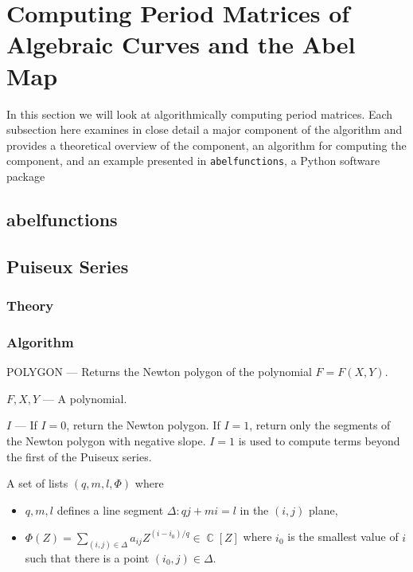 \documentclass[10pt,twoside]{article}
\newcommand{\Input}{\Require}
\newcommand{\Output}{\Ensure}
\numberwithin{equation}{section}
\DeclareMathOperator{\CC}{\mathbb{C}}
\begin{document}
\section{Computing Period Matrices of Algebraic Curves and the Abel Map}

In this section we will look at algorithmically computing period
matrices. Each subsection here examines in close detail a major
component of the algorithm and provides a theoretical overview of the
component, an algorithm for computing the component, and an example
presented in {\tt abelfunctions}, a Python software package


\subsection{abelfunctions}

\subsection{Puiseux Series}

%
\subsubsection*{Theory}
%

%
\subsubsection*{Algorithm}
%

\begin{algorithm}[h]
\caption{POLYGON --- Returns the Newton polygon of the polynomial $F =
  F(X,Y)$.}
\label{alg: puiseux-polygon}
\begin{algorithmic}[1]
\Input

$F,X,Y$ --- A polynomial.

$I$ --- If $I=0$, return the Newton polygon. If $I=1$, return only the
segments of the Newton polygon with negative slope. $I=1$ is used to
compute terms beyond the first of the Puiseux series.

\Output A set of lists $(q,m,l,\Phi)$ where
\begin{itemize}
  \item $q,m,l$ defines a line segment $\Delta: qj+mi=l$ in the $(i,j)$
    plane,
  \item $\Phi(Z) = \sum_{(i,j)\in\Delta} a_{ij} Z^{(i-i_0)/q} \in
    \CC[Z]$ where $i_0$ is the smallest value of $i$ such that there is
    a point $(i_0,j)\in\Delta$.
\end{itemize}

  \State
\EndFunction
\end{algorithmic}
\end{algorithm}
\end{document}
